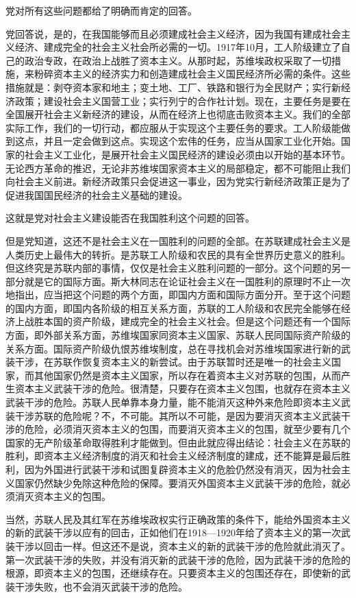 党对所有这些问题都给了明确而肯定的回答。

党回答说，是的，在我国能够而且必须建成社会主义经济，因为我国有建成社会主义经济、建成完全的社会主义社会所必需的一切。1917年10月，工人阶级建立了自己的政治专政，在政治上战胜了资本主义。从那时起，苏维埃政权采取了一切措施，来粉碎资本主义的经济实力和创造建成社会主义国民经济所必需的条件。这些措施就是：剥夺资本家和地主；变土地、工厂、铁路和银行为全民财产；实行新经济政策；建设社会主义国营工业；实行列宁的合作社计划。现在，主要任务是要在全国展开社会主义新经济的建设，从而在经济上也彻底击败资本主义。我们的全部实际工作，我们的一切行动，都应服从于实现这个主要任务的要求。工人阶级能做到这点，并且一定会做到这点。实现这个宏伟的任务，应当从国家工业化开始。国家的社会主义工业化，是展开社会主义国民经济的建设必须由以开始的基本环节。无论西方革命的推迟，无论非苏维埃国家资本主义的局部稳定，都不可能阻止我们向社会主义前进。新经济政策只会促进这一事业，因为党实行新经济政策正是为了促进我国国民经济的社会主义基础的建设。

这就是党对社会主义建设能否在我国胜利这个问题的回答。

但是党知道，这还不是社会主义在一国胜利的问题的全部。在苏联建成社会主义是人类历史上最伟大的转折。是苏联工人阶级和农民的具有全世界历史意义的胜利。但这终究是苏联内部的事情，仅仅是社会主义胜利问题的一部分。这个问题的另一部分就是它的国际方面。斯大林同志在论证社会主义在一国胜利的原理时不止一次地指出，应当把这个问题的两个方面，即国内方面和国际方面分开。至于这个问题的国内方面，即国内各阶级的相互关系方面，苏联的工人阶级和农民完全能够在经济上战胜本国的资产阶级，建成完全的社会主义社会。但是这个问题还有一个国际方面，即外部关系方面，苏维埃国家同资本主义国家、苏联人民同国际资产阶级的关系方面。国际资产阶级仇恨苏维埃制度，总在寻找机会对苏维埃国家进行新的武装干涉，在苏联作恢复资本主义的新尝试。由于苏联暂时还是唯一的社会主义国家，而其他国家仍然是资本主义国家，所以存在着资本主义对苏联的包围，从而产生资本主义武装干涉的危险。很清楚，只要存在资本主义包围，也就存在资本主义武装干涉的危险。苏联人民单靠本身力量，能不能消灭这种外来危险即资本主义武装干涉苏联的危险呢？不，不可能。其所以不可能，是因为要消灭资本主义武装干涉的危险，必须消灭资本主义的包围，而要消灭资本主义的包围，就至少要有几个国家的无产阶级革命取得胜利才能做到。但由此就应得出结论：社会主义在苏联的胜利，即资本主义经济制度的消灭和社会主义经济制度的建成，还不能算是最后胜利，因为外国进行武装干涉和试图复辟资本主义的危脸仍然没有消灭，因为社会主义国家仍然缺少免除这种危险的保障。要消灭外国资本主义武装干涉的危险，就必须消灭资本主义的包围。

当然，苏联人民及其红军在苏维埃政权实行正确政策的条件下，能给外国资本主义的新的武装干涉以应有的回击，正如他们在1918—1920年给了资本主义的第一次武装干涉以回击一样。但这还不是说，资本主义的新的武装干涉的危险就此消灭了。第一次武装干涉的失败，并没有消灭新的武装干涉的危险，因为武装干涉的危险的根源，即资本主义的包围，还继续存在。只要资本主义的包围还存在，即使新的武装干涉失败，也不会消灭武装干涉的危险。

